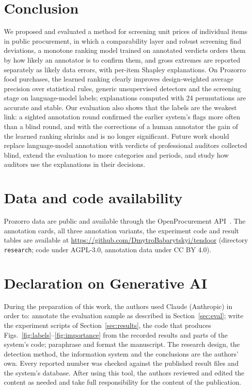 \documentclass[conference]{IEEEtran}
\begin{document}
\section{Conclusion}
We proposed and evaluated a method for screening unit prices of individual items in public procurement,
in which a comparability layer and robust screening find deviations, a monotone ranking model trained on
annotated verdicts orders them by how likely an annotator is to confirm them, and gross extremes are
reported separately as likely data errors, with per-item Shapley explanations. On Prozorro food purchases,
the learned ranking clearly improves design-weighted average precision over statistical rules, generic
unsupervised detectors and the screening stage on language-model labels; explanations computed with 24
permutations are accurate and stable. Our evaluation also shows that the labels are the weakest link: a
sighted annotation round confirmed the earlier system's flags more often than a blind round, and with the
corrections of a human annotator the gain of the learned ranking shrinks and is no longer significant. Future work should replace language-model annotation with verdicts of
professional auditors collected blind, extend the evaluation to more categories and periods, and study how
auditors use the explanations in their decisions.

\section*{Data and code availability}
Prozorro data are public and available through the OpenProcurement API~\cite{prozorroapi}. The
annotation cards, all three annotation variants, the experiment code and result tables are available at
\url{https://github.com/DmytroBabarytskyi/tendoor} (directory \texttt{research}; code under AGPL-3.0,
annotation data under CC BY 4.0).

\section*{Declaration on Generative AI}
During the preparation of this work, the authors used Claude (Anthropic) in order to: annotate the
evaluation sample as described in Section~\ref{sec:eval};
write the experiment scripts of Section~\ref{sec:results}, the code that produces
Figs.~\ref{fig:labels}--\ref{fig:importance} from the recorded results and parts of the system's code;
paraphrase and format the manuscript. The research design, the detection method, the information system
and the conclusions are the authors' own. Every reported number was checked against the
published result files and the system's database. After using this tool, the authors reviewed and edited
the content as needed and take full responsibility for the content of the publication.
\end{document}

